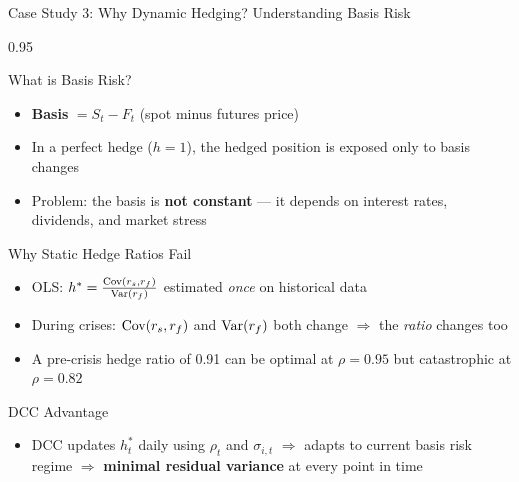 \documentclass[9pt, aspectratio=169, t]{beamer}
\begin{document}
\begin{frame}{Case Study 3: Why Dynamic Hedging? Understanding Basis Risk}
    \begin{cminipage}{0.95\textwidth}
    {\footnotesize
    \begin{block}{What is Basis Risk?}
        \begin{itemize}\setlength{\itemsep}{1pt}
            \item \textbf{Basis} $= S_t - F_t$ (spot minus futures price)
            \item In a perfect hedge ($h = 1$), the hedged position is exposed only to basis changes
            \item Problem: the basis is \textbf{not constant} --- it depends on interest rates, dividends, and market stress
        \end{itemize}
    \end{block}
    \begin{block}{Why Static Hedge Ratios Fail}
        \begin{itemize}\setlength{\itemsep}{1pt}
            \item OLS: $h^* = \frac{\text{Cov}(r_s, r_f)}{\text{Var}(r_f)}$ estimated \textit{once} on historical data
            \item During crises: $\text{Cov}(r_s, r_f)$ and $\text{Var}(r_f)$ both change $\Rightarrow$ the \textit{ratio} changes too
            \item A pre-crisis hedge ratio of 0.91 can be optimal at $\rho = 0.95$ but catastrophic at $\rho = 0.82$
        \end{itemize}
    \end{block}
    \begin{alertblock}{DCC Advantage}
        \begin{itemize}\setlength{\itemsep}{0pt}
            \item DCC updates $h_t^*$ daily using $\rho_t$ and $\sigma_{i,t}$ $\Rightarrow$ adapts to current basis risk regime $\Rightarrow$ \textbf{minimal residual variance} at every point in time
        \end{itemize}
    \end{alertblock}
    }
    \end{cminipage}
\end{frame}
\end{document}
